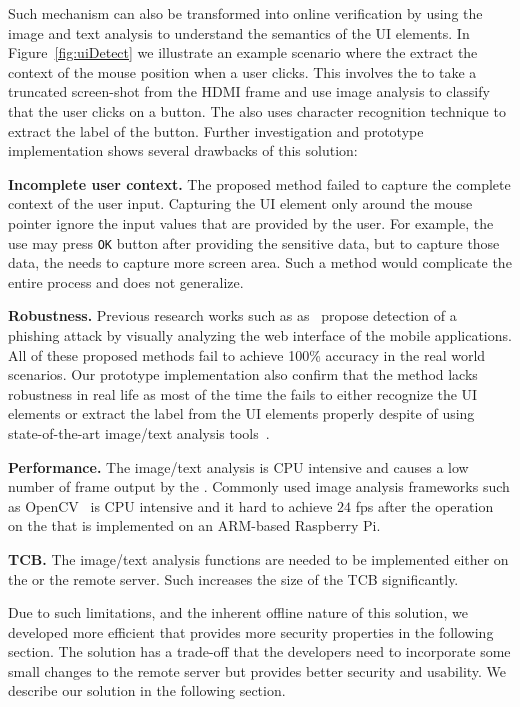 Such \poa mechanism can also be transformed into online verification by using the image and text analysis to understand the semantics of the UI elements. In Figure~\ref{fig:uiDetect} we illustrate an example scenario where the \device extract the context of the mouse position when a user clicks. This involves the \device to take a truncated screen-shot from the HDMI frame and use image analysis to classify that the user clicks on a button. The \device also uses character recognition technique to extract the label of the button. Further investigation and prototype implementation shows several drawbacks of this solution:

\begin{mylist}
  \item \textbf{Incomplete user context.} The proposed method failed to capture the complete context of the user input. Capturing the UI element only around the mouse pointer ignore the input values that are provided by the user. For example, the use may press \texttt{OK} button after providing the sensitive data, but to capture those data, the \device needs to capture more screen area. Such a method would complicate the entire process and does not generalize.
  \item \textbf{Robustness.} Previous research works such as as~\cite{lukaSpoof,Chen:2010:DVS:1754393.1754394} propose detection of a phishing attack by visually analyzing the web interface of the mobile applications. All of these proposed methods fail to achieve 100\% accuracy in the real world scenarios. Our prototype implementation also confirm that the method lacks robustness in real life as most of the time the \device fails to either recognize the UI elements or extract the label from the UI elements properly despite of using state-of-the-art image/text analysis tools~\cite{opencv}.
  \item \textbf{Performance.} The image/text analysis is CPU intensive and causes a low number of frame output by the \device. Commonly used image analysis frameworks such as OpenCV~\cite{opencv} is CPU intensive and it hard to achieve $24$ fps after the operation on the \device that is implemented on an ARM-based Raspberry Pi.
  \item \textbf{TCB.} The image/text analysis functions are needed to be implemented either on the \device or the remote server. Such increases the size of the TCB significantly.
\end{mylist}

Due to such limitations, and the inherent offline nature of this solution, we developed more efficient \poa that provides more security properties in the following section. The solution has a trade-off that the developers need to incorporate some small changes to the remote server but provides better security and usability. We describe our solution in the following section.


